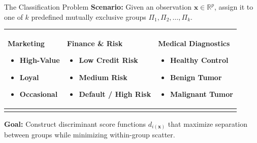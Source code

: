 \documentclass[aspectratio=169,ignorenonframetext]{beamer}
\begin{document}
\begin{frame}{The Classification Problem}
\textbf{Scenario:} Given an observation
\(\mathbf{x} \in \mathbb{R}^{p}\), assign it to one of \(k\) predefined
mutually exclusive groups \(\Pi_{1},\Pi_{2},\ldots,\Pi_{k}\).

{\def\LTcaptype{none} %
\begin{longtable}[]{@{}
  >{\raggedright\arraybackslash}p{}
  >{\raggedright\arraybackslash}p{}
  >{\raggedright\arraybackslash}p{}@{}}
\toprule\noalign{}
\endhead
\begin{minipage}[t]{\linewidth}\raggedright
\textbf{Marketing}

\begin{itemize}
\item
  High-Value
\item
  Loyal
\item
  Occasional
\end{itemize}
\end{minipage} & \begin{minipage}[t]{\linewidth}\raggedright
\textbf{Finance \& Risk}

\begin{itemize}
\item
  Low Credit Risk
\item
  Medium Risk
\item
  Default / High Risk
\end{itemize}
\end{minipage} & \begin{minipage}[t]{\linewidth}\raggedright
\textbf{Medical Diagnostics}

\begin{itemize}
\item
  Healthy Control
\item
  Benign Tumor
\item
  Malignant Tumor
\end{itemize}
\end{minipage} \\
\bottomrule\noalign{}
\end{longtable}
}

\textbf{Goal:} Construct discriminant score functions
\(d_{i\left( \mathbf{x} \right)}\) that maximize separation between
groups while minimizing within-group scatter.
\end{frame}
\end{document}

